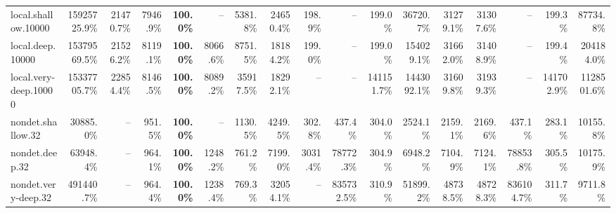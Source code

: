\documentclass{article}
\begin{document}
\begin{center}
{\begin{tabular}{lrrrrrrrrrrrrrrrr}
local.shallow.10000 & 15925725.9\% & 21470.7\% & 7946.9\% & \textbf{100.0\%} & -- & 5381.8\% & 24650.4\% & 198.9\% & -- & 199.0\% & 36720.7\% & 31279.1\% & 31307.6\% & -- & 199.3\% & 87734.8\% \\
local.deep.10000 & 15379569.5\% & 21526.2\% & 8119.1\% & \textbf{100.0\%} & 8066.6\% & 8751.5\% & 18184.2\% & 199.0\% & -- & 199.0\% & 154029.1\% & 31662.0\% & 31408.9\% & -- & 199.4\% & 204184.0\% \\
local.very-deep.10000 & 15337705.7\% & 22854.4\% & 8146.5\% & \textbf{100.0\%} & 8089.2\% & 35917.5\% & 18292.1\% & -- & -- & 141151.7\% & 1443092.1\% & 31609.8\% & 31939.3\% & -- & 141702.9\% & 1128501.6\% \\
nondet.shallow.32 & 30885.0\% & -- & 951.5\% & \textbf{100.0\%} & -- & 1130.5\% & 4249.5\% & 302.8\% & 437.4\% & 304.0\% & 2524.1\% & 2159.1\% & 2169.6\% & 437.1\% & 283.1\% & 10155.8\% \\
nondet.deep.32 & 63948.4\% & -- & 964.1\% & \textbf{100.0\%} & 1248.2\% & 761.2\% & 7199.0\% & 3031.4\% & 78772.3\% & 304.9\% & 6948.2\% & 7104.9\% & 7124.1\% & 78853.8\% & 305.5\% & 10175.9\% \\
nondet.very-deep.32 & 491440.7\% & -- & 964.4\% & \textbf{100.0\%} & 1238.4\% & 769.3\% & 32054.1\% & -- & 835732.5\% & 310.9\% & 51899.2\% & 48738.5\% & 48728.3\% & 836104.7\% & 311.7\% & 9711.8\% \\
\bottomrule
\end{tabular}
}
\end{center}
\end{document}
